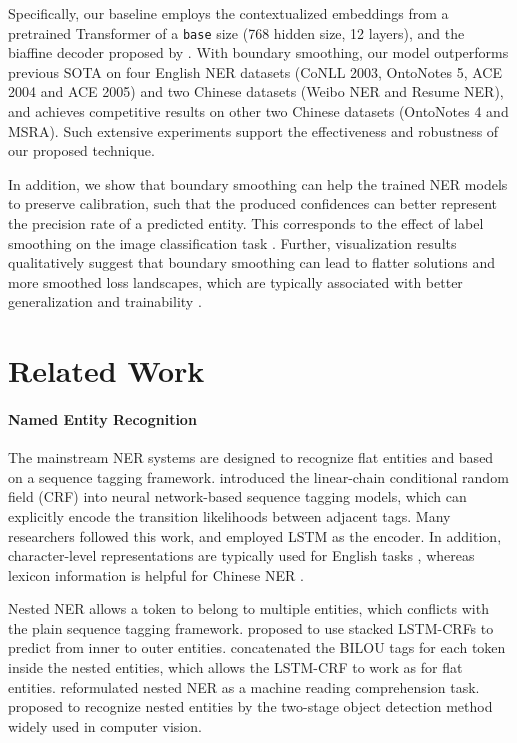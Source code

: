 \documentclass[11pt]{article}
\begin{document}
Specifically, our baseline employs the contextualized embeddings from a pretrained Transformer of a \texttt{base} size (768 hidden size, 12 layers), and the biaffine decoder proposed by \citet{yu-etal-2020-named}. With boundary smoothing, our model outperforms previous SOTA on four English NER datasets (CoNLL 2003, OntoNotes 5, ACE 2004 and ACE 2005) and two Chinese datasets (Weibo NER and Resume NER), and achieves competitive results on other two Chinese datasets (OntoNotes 4 and MSRA). Such extensive experiments support the effectiveness and robustness of our proposed technique. 

In addition, we show that boundary smoothing can help the trained NER models to preserve calibration, such that the produced confidences can better represent the precision rate of a predicted entity. This corresponds to the effect of label smoothing on the image classification task \citep{muller2019when}. Further, visualization results qualitatively suggest that boundary smoothing can lead to flatter solutions and more smoothed loss landscapes, which are typically associated with better generalization and trainability \citep{hochreiter1997flat,li2018visualizing}. 


\section{Related Work} \label{sec:related-work}
\paragraph{Named Entity Recognition} The mainstream NER systems are designed to recognize flat entities and based on a sequence tagging framework. \citet{collobert2011natural} introduced the linear-chain conditional random field (CRF) into neural network-based sequence tagging models, which can explicitly encode the transition likelihoods between adjacent tags. Many researchers followed this work, and employed LSTM as the encoder. In addition, character-level representations are typically used for English tasks \citep{huang2015bidirectional, lample-etal-2016-neural, ma-hovy-2016-end, chiu-nichols-2016-named}, whereas lexicon information is helpful for Chinese NER \citep{zhang-yang-2018-chinese, ma-etal-2020-simplify, li-etal-2020-flat}. 

Nested NER allows a token to belong to multiple entities, which conflicts with the plain sequence tagging framework. \citet{ju-etal-2018-neural} proposed to use stacked LSTM-CRFs to predict from inner to outer entities. \citet{strakova-etal-2019-neural} concatenated the BILOU tags for each token inside the nested entities, which allows the LSTM-CRF to work as for flat entities. \citet{li-etal-2020-unified} reformulated nested NER as a machine reading comprehension task. \citet{shen-etal-2021-locate} proposed to recognize nested entities by the two-stage object detection method widely used in computer vision. 
\end{document}
